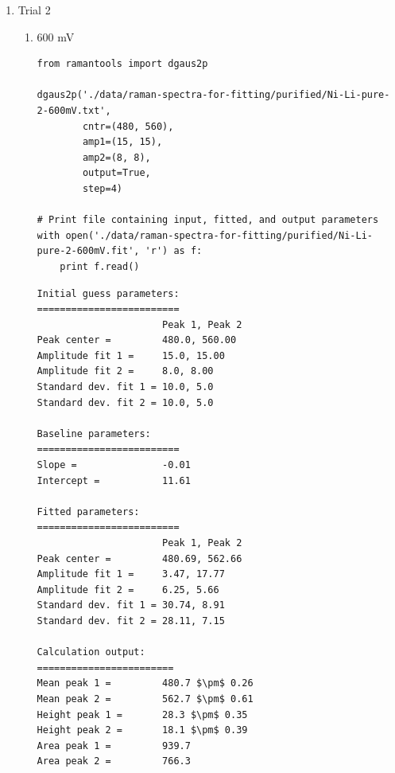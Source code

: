 \documentclass[journal=jpccck,manuscript=suppinfo,email=true]{achemso}
\begin{document}
\begin{enumerate}
\begin{enumerate}
\begin{enumerate}
\begin{verbatim}
Baseline parameters:
=========================
Slope =               -0.01
Intercept =           12.52

Fitted parameters:
=========================
                      Peak 1, Peak 2
Peak center =         480.96, 559.90
Amplitude fit 1 =     11.35, 15.80
Amplitude fit 2 =     8.16, 8.55
Standard dev. fit 1 = 17.09, 7.00
Standard dev. fit 2 = 30.13, 6.84

Calculation output:
========================
Mean peak 1 =         481.0 $\pm$ 0.21
Mean peak 2 =         559.9 $\pm$ 0.43
Height peak 1 =       34.6 $\pm$ 0.42
Height peak 2 =       23.3 $\pm$ 0.37
Area peak 1 =         1079.8
Area peak 2 =         1078.5
\end{verbatim}
\end{enumerate}

\item Trial 2
\label{sec-4-1-0-1-2}
\begin{enumerate}
\item 600 mV
\label{sec-4-1-0-1-2-1}
\begin{verbatim}
from ramantools import dgaus2p

dgaus2p('./data/raman-spectra-for-fitting/purified/Ni-Li-pure-2-600mV.txt',
        cntr=(480, 560),
        amp1=(15, 15),
        amp2=(8, 8),
        output=True,
        step=4)

# Print file containing input, fitted, and output parameters
with open('./data/raman-spectra-for-fitting/purified/Ni-Li-pure-2-600mV.fit', 'r') as f:
    print f.read()
\end{verbatim}

\begin{verbatim}
Initial guess parameters:
=========================
                      Peak 1, Peak 2
Peak center =         480.0, 560.00
Amplitude fit 1 =     15.0, 15.00
Amplitude fit 2 =     8.0, 8.00
Standard dev. fit 1 = 10.0, 5.0
Standard dev. fit 2 = 10.0, 5.0

Baseline parameters:
=========================
Slope =               -0.01
Intercept =           11.61

Fitted parameters:
=========================
                      Peak 1, Peak 2
Peak center =         480.69, 562.66
Amplitude fit 1 =     3.47, 17.77
Amplitude fit 2 =     6.25, 5.66
Standard dev. fit 1 = 30.74, 8.91
Standard dev. fit 2 = 28.11, 7.15

Calculation output:
========================
Mean peak 1 =         480.7 $\pm$ 0.26
Mean peak 2 =         562.7 $\pm$ 0.61
Height peak 1 =       28.3 $\pm$ 0.35
Height peak 2 =       18.1 $\pm$ 0.39
Area peak 1 =         939.7
Area peak 2 =         766.3
\end{verbatim}


\end{enumerate}
\end{enumerate}
\end{enumerate}
\end{document}
